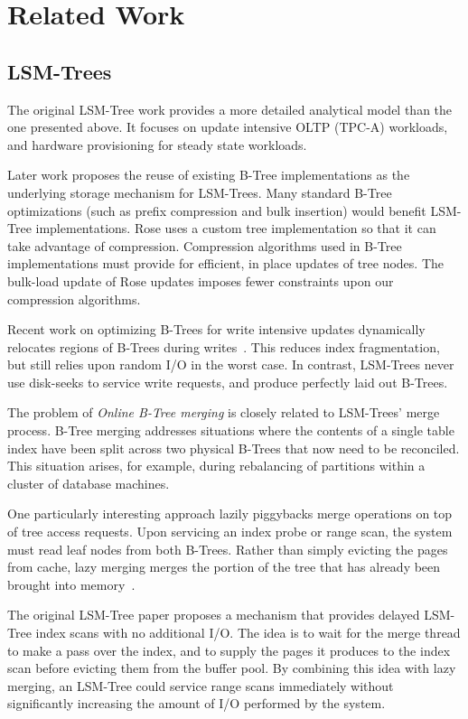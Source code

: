 \documentclass{vldb}
\newcommand{\rows}{Rose\xspace}
\begin{document}
\section{Related Work}

\subsection{LSM-Trees}

The original LSM-Tree work\cite{lsm} provides a more detailed
analytical model than the one presented above.  It focuses on update
intensive OLTP (TPC-A) workloads, and hardware provisioning for steady
state workloads.

Later work proposes the reuse of existing B-Tree implementations as
the underlying storage mechanism for LSM-Trees\cite{cidrPartitionedBTree}.  Many
standard B-Tree optimizations (such as prefix compression and bulk insertion)
would benefit LSM-Tree implementations.  \rows uses a custom tree
implementation so that it can take advantage of compression.
Compression algorithms used in B-Tree implementations must provide for
efficient, in place updates of tree nodes.  The bulk-load update of
\rows updates imposes fewer constraints upon our compression
algorithms.

Recent work on optimizing B-Trees for write intensive updates dynamically
relocates regions of B-Trees during
writes~\cite{bTreeHighUpdateRates}.  This reduces index fragmentation,
but still relies upon random I/O in the worst case.  In contrast,
LSM-Trees never use disk-seeks to service write requests, and produce
perfectly laid out B-Trees.

The problem of {\em Online B-Tree merging} is closely related to
LSM-Trees' merge process.  B-Tree merging addresses situations where
the contents of a single table index have been split across two
physical B-Trees that now need to be reconciled.  This situation
arises, for example, during rebalancing of partitions within a cluster
of database machines.

One particularly interesting approach lazily piggybacks merge
operations on top of tree access requests.  Upon servicing an index
probe or range scan, the system must read leaf nodes from both B-Trees.
Rather than simply evicting the pages from cache, lazy merging merges
the portion of the tree that has already been brought into
memory~\cite{onlineMerging}.

The original LSM-Tree paper proposes a mechanism that provides delayed
LSM-Tree index scans with no additional I/O.  The idea is to wait for
the merge thread to make a pass over the index, and to supply the
pages it produces to the index scan before evicting them from the
buffer pool.
By combining this idea with lazy merging, an LSM-Tree could service
range scans immediately without significantly increasing the amount of
I/O performed by the system.
\end{document}

